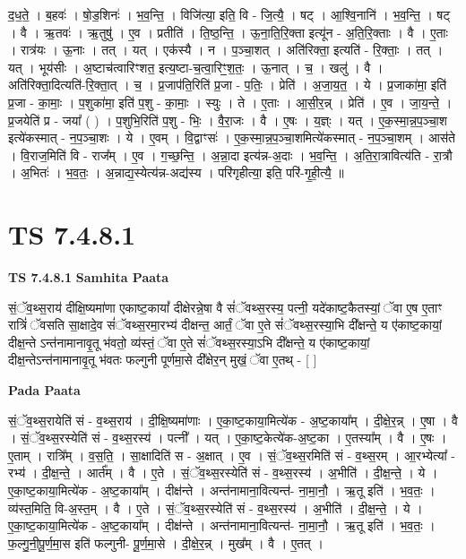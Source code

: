 \documentclass[17pt]{extarticle}
\begin{document}
द॒ध॒ते॒ । ब॒हवः॑ । षो॒ड॒शिनः॑ । भ॒व॒न्ति॒ । विजि॑त्या॒ इति॒ वि - जि॒त्यै॒ । षट् । आ॒श्वि॒नानि॑ । भ॒व॒न्ति॒ । षट् । वै । ऋ॒तवः॑ । ऋ॒तुषु॑ । ए॒व । प्रतीति॑ । ति॒ष्ठ॒न्ति॒ । ऊ॒ना॒ति॒रि॒क्ता इत्यू॑न - अ॒ति॒रि॒क्ताः । वै । ए॒ताः । रात्र॑यः । ऊ॒नाः । तत् । यत् । एक॑स्यै । न । प॒ञ्चा॒शत् । अति॑रिक्ता॒ इत्यति॑ - रि॒क्ताः॒ । तत् । यत् । भूय॑सीः । अ॒ष्टाच॑त्वारिꣳशत॒ इत्य॒ष्टा-च॒त्वा॒रिꣳ॒॒श॒तः॒ । ऊ॒नात् । च॒ । खलु॑ । वै । अति॑रिक्ता॒दित्यति॑-रि॒क्ता॒त् । च॒ । प्र॒जाप॑ति॒रिति॑ प्र॒जा - प॒तिः॒ । प्रेति॑ । अ॒जा॒य॒त॒ । ये । प्र॒जाका॑मा॒ इति॑ प्र॒जा - का॒माः॒ । प॒शुका॑मा॒ इति॑ प॒शु - का॒माः॒ । स्युः । ते । ए॒ताः । आ॒सी॒र॒न्न् । प्रेति॑ । ए॒व । जा॒य॒न्ते॒ । प्र॒जयेति॑ प्र - जया᳚ ( ) । प॒शुभि॒रिति॑ प॒शु - भिः॒ । वै॒रा॒जः । वै । ए॒षः । य॒ज्ञ्ः । यत् । ए॒क॒स्मा॒न्न॒प॒ञ्चा॒श इत्ये॑कस्मात् - न॒प॒ञ्चा॒शः । ये । ए॒वम् । वि॒द्वाꣳसः॑ । ए॒क॒स्मा॒न्न॒प॒ञ्चा॒शमित्ये॑कस्मात् - न॒प॒ञ्चा॒शम् । आस॑ते । वि॒राज॒मिति॑ वि - राज᳚म् । ए॒व । ग॒च्छ॒न्ति॒ । अ॒न्ना॒दा इत्य॑न्न-अ॒दाः । भ॒व॒न्ति॒ । अ॒ति॒रा॒त्रावित्य॑ति - रा॒त्रौ । अ॒भितः॑ । भ॒व॒तः॒ । अ॒न्नाद्य॒स्येत्य॑न्न-अद्य॑स्य । परि॑गृहीत्या॒ इति॒ परि॑-गृ॒ही॒त्यै॒ ॥  \newline




\section*{ TS 7.4.8.1 }

\textbf{TS 7.4.8.1 } \newline
\textbf{Samhita Paata} \newline

सं॒ॅव॒थ्स॒राय॑ दीक्षि॒ष्यमा॑णा एकाष्ट॒कायां᳚ दीक्षेरन्ने॒षा वै सं॑ॅवथ्स॒रस्य॒ पत्नी॒ यदे॑काष्ट॒कैतस्यां॒ ॅवा ए॒ष ए॒ताꣳ रात्रिं॑ ॅवसति सा॒क्षादे॒व सं॑ॅवथ्स॒रमा॒रभ्य॑ दीक्षन्त॒ आर्तं॒ ॅवा ए॒ते सं॑ॅवथ्स॒रस्या॒भि दी᳚क्षन्ते॒ य ए॑काष्ट॒कायां॒ दीक्ष॒न्ते ऽन्त॑नामानावृ॒तू भ॑वतो॒ व्य॑स्तं॒ ॅवा ए॒ते सं॑ॅवथ्स॒रस्या॒ऽभि दी᳚क्षन्ते॒ य ए॑काष्ट॒कायां॒ दीक्ष॒न्तेऽन्त॑नामानावृ॒तू भ॑वतः फल्गुनी पूर्णमा॒से दी᳚क्षेर॒न् मुखं॒ ॅवा ए॒तथ् - [  ] \newline

\textbf{Pada Paata} \newline

सं॒ॅव॒थ्स॒रायेति॑ सं - व॒थ्स॒राय॑ । दी॒क्षि॒ष्यमा॑णाः । ए॒का॒ष्ट॒काया॒मित्ये॑क - अ॒ष्ट॒काया᳚म् । दी॒क्षे॒र॒न्न् । ए॒षा । वै । सं॒ॅव॒थ्स॒रस्येति॑ सं - व॒थ्स॒रस्य॑ । पत्नी᳚ । यत् । ए॒का॒ष्ट॒केत्ये॑क-अ॒ष्ट॒का । ए॒तस्या᳚म् । वै । ए॒षः । ए॒ताम् । रात्रि᳚म् । व॒स॒ति॒ । सा॒क्षादिति॑ स - अ॒क्षात् । ए॒व । सं॒ॅव॒थ्स॒रमिति॑ सं -  व॒थ्स॒रम् । आ॒रभ्येत्या᳚ - रभ्य॑ । दी॒क्ष॒न्ते॒ । आर्त᳚म् । वै । ए॒ते । सं॒ॅव॒थ्स॒रस्येति॑ सं - व॒थ्स॒रस्य॑ । अ॒भीति॑ । दी॒क्ष॒न्ते॒ । ये । ए॒का॒ष्ट॒काया॒मित्ये॑क - अ॒ष्ट॒काया᳚म् । दीक्ष॑न्ते । अन्त॑नामाना॒वित्यन्त॑- ना॒मा॒नौ॒ । ऋ॒तू इति॑ । भ॒व॒तः॒ । व्य॑स्त॒मिति॒ वि-अ॒स्त॒म् । वै । ए॒ते । सं॒ॅव॒थ्स॒रस्येति॑ सं - व॒थ्स॒रस्य॑ । अ॒भीति॑ । दी॒क्ष॒न्ते॒ । ये । ए॒का॒ष्ट॒काया॒मित्ये॑क - अ॒ष्ट॒काया᳚म् । दीक्ष॑न्ते । अन्त॑नामाना॒वित्यन्त॑- ना॒मा॒नौ॒ । ऋ॒तू इति॑ । भ॒व॒तः॒ । फ॒ल्गु॒नी॒पू॒र्ण॒मा॒स इति॑ फल्गुनी- पू॒र्ण॒मा॒से । दी॒क्षे॒र॒न्न् । मुख᳚म् । वै । ए॒तत् ।  \newline
\end{document}
